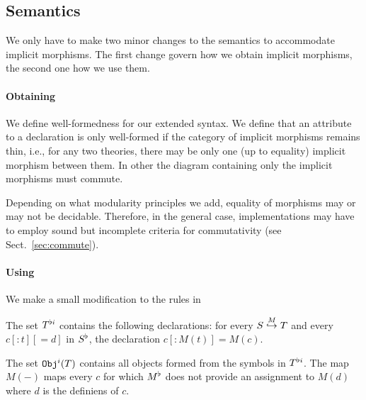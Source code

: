 \subsection{Semantics}

We only have to make two minor changes to the semantics to accommodate implicit morphisms.
The first change govern how we obtain implicit morphisms, the second one how we use them.

\paragraph{Obtaining}
We define well-formedness for our extended syntax.
We define that an attribute to a declaration is only well-formed if the category of implicit morphisms remains thin, i.e., for any two theories, there may be only one (up to equality) implicit morphism between them.
In other the diagram containing only the implicit morphisms must commute.

Depending on what modularity principles we add, equality of morphisms may or may not be decidable.
Therefore, in the general case, implementations may have to employ sound but incomplete criteria for commutativity (see Sect.~\ref{sec:commute}).

%

\paragraph{Using}
We make a small modification to the rules in 

\begin{definition}
The set $\flti{T}$ contains the following declarations:
for every $\ipc{M}{S}{T}$ and every $c[:t][=d]$ in $\flt{S}$, the declaration $c[:M(t)]=M(c)$.

The set $\Expi{T}$ contains all objects formed from the symbols in $\flti{T}$.
The map $M(-)$ maps every $c$ for which $\flt{M}$ does not provide an assignment to $M(d)$ where $d$ is the definiens of $c$.
\end{definition}

